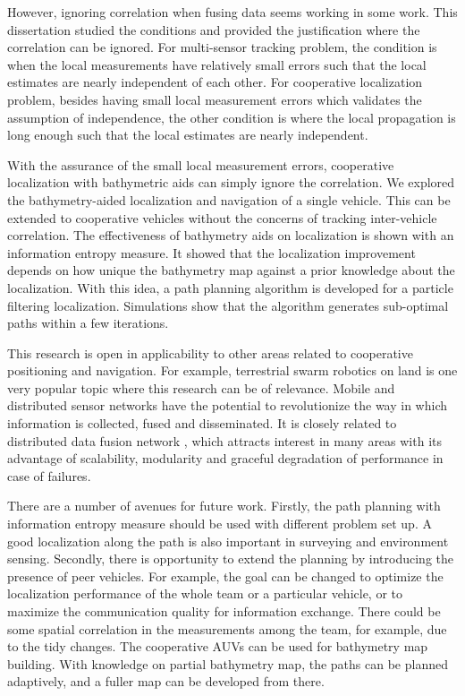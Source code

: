 However, ignoring correlation when fusing data seems working in some work. This dissertation studied the conditions and provided the justification where the correlation can be ignored. For multi-sensor tracking problem, the condition is when the local measurements have relatively small errors such that the local estimates are nearly independent of each other. For cooperative localization problem, besides having small local measurement errors which validates the assumption of independence, the other condition is where the local propagation is long enough such that the local estimates are nearly independent.

With the assurance of the small local measurement errors, cooperative localization with bathymetric aids can simply ignore the correlation. We explored the bathymetry-aided localization and navigation of a single vehicle. This can be extended to cooperative vehicles without the concerns of tracking inter-vehicle correlation. The effectiveness of bathymetry aids on localization is shown with an information entropy measure. It showed that the localization improvement depends on how unique the bathymetry map against a prior knowledge about the localization. With this idea, a path planning algorithm is developed for a particle filtering localization. Simulations show that the algorithm generates sub-optimal paths within a few iterations.

This research is open in applicability to other areas related to cooperative positioning and navigation. For
example, terrestrial swarm robotics on land is one very popular topic where this research can be of relevance. Mobile and distributed sensor networks have the potential to revolutionize the way in which information is collected, fused and disseminated. It is closely related to distributed data fusion network \cite{Julier1997}, which attracts interest in many areas with its advantage of scalability, modularity and graceful degradation of performance in case of failures.

There are a number of avenues for future work. Firstly, the path planning with information entropy measure should be used with different problem set up. A good localization along the path is also important in surveying and environment sensing. Secondly, there is opportunity to extend the planning by introducing the presence of peer vehicles. For example, the goal can be changed to optimize the localization performance of the whole team or a particular vehicle, or to maximize the communication quality for information exchange. There could be some spatial correlation in the measurements among the team, for example, due to the tidy changes. The cooperative AUVs can be used for bathymetry map building. With knowledge on partial bathymetry map, the paths can be planned adaptively, and a fuller map can be developed from there.